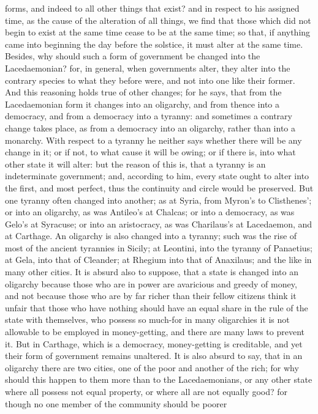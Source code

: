 forms, and indeed to all other things that exist? and in respect to his
assigned time, as the cause of the alteration of all things, we find that
those which did not begin to exist at the same time cease to be at the
same time; so that, if anything came into beginning the day before the
solstice, it must alter at the same time. Besides, why should such a form
of government be changed into the Lacedaemonian? for, in general, when
governments alter, they alter into the contrary species to what they
before were, and not into one like their former. And this reasoning holds
true of other changes; for he says, that from the Lacedaemonian form it
changes into an oligarchy, and from thence into a democracy, and from a
democracy into a tyranny: and sometimes a contrary change takes place, as
from a democracy into an oligarchy, rather than into a monarchy. With
respect to a tyranny he neither says whether there will be any change in
it; or if not, to what cause it will be owing; or if there is, into what
other state it will alter: but the reason of this is, that a tyranny is an
indeterminate government; and, according to him, every state ought to
alter into the first, and most perfect, thus the continuity and circle
would be preserved. But one tyranny often changed into another; as at
Syria, from Myron's to Clisthenes'; or into an oligarchy, as was Antileo's
at Chalcas; or into a democracy, as was Gelo's at Syracuse; or into an
aristocracy, as was Charilaus's at Lacedaemon, and at Carthage. An
oligarchy is also changed into a tyranny; such was the rise of most of the
ancient tyrannies in Sicily; at Leontini, into the tyranny of Panaetius;
at Gela, into that of Cleander; at Rhegium into that of Anaxilaus; and the
like in many other cities. It is absurd also to suppose, that a state is
changed into an oligarchy because those who are in power are avaricious
and greedy of money, and not because those who are by far richer than
their fellow citizens think it unfair that those who have nothing should
have an equal share in the rule of the state with themselves, who possess
so much-for in many oligarchies it is not allowable to be employed in
money-getting, and there are many laws to prevent it. But in Carthage,
which is a democracy, money-getting is creditable, and yet their form of
government remains unaltered. It is also absurd to say, that in an
oligarchy there are two cities, one of the poor and another of the rich;
for why should this happen to them more than to the Lacedaemonians, or any
other state where all possess not equal property, or where all are not
equally good? for though no one member of the community should be poorer
